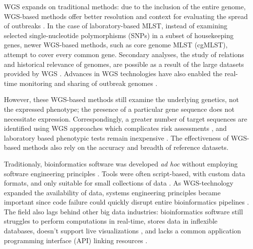 \documentclass[a4,center,fleqn]{NAR}
\begin{document}
WGS expands on traditional methods: due to the inclusion of the entire genome, WGS-based methods offer better resolution and context for evaluating the spread of outbreaks \cite{ronholm2016navigating}.
In the case of laboratory-based MLST, instead of examining selected single-nucleotide polymorphisms (SNPs) in a subset of housekeeping genes, newer WGS-based methods, such as core genome MLST (cgMLST), attempt to cover every common gene.
Secondary analyses, the study of relations and historical relevance of genomes, are possible as a result of the large datasets provided by WGS \cite{ronholm2016navigating}.
Advances in WGS technologies have also enabled the real-time monitoring and sharing of outbreak genomes \cite{ronholm2016navigating}.

However, these WGS-based methods still examine the underlying genetics, not the expressed phenotype; the presence of a particular gene sequence does not necessitate expression.
Correspondingly, a greater number of target sequences are identified using WGS approaches which complicates risk assessments \cite{ronholm2016navigating}, and laboratory based phenotypic tests remain inexpensive \cite{koser2012routine}.
The effectiveness of WGS-based methods also rely on the accuracy and breadth of reference datasets.

Traditionaly, bioinformatics software was developed \textit{ad hoc} without employing software engineering principles \cite{de2015trends}.
Tools were often script-based, with custom data formats, and only suitable for small collections of data \cite{de2015trends}.
As WGS-technology expanded the availability of data, systems engineering principles became important since code failure could quickly disrupt entire bioinformatics pipelines \cite{schatz2015biological}.
The field also lags behind other big data industries: bioinformatics software still struggles to perform computations in real-time, stores data in inflexible databases, doesn't support live visualizations \cite{de2015trends}, and lacks a common application programming interface (API) linking resources \cite{swaminathan2016review}.
\end{document}
